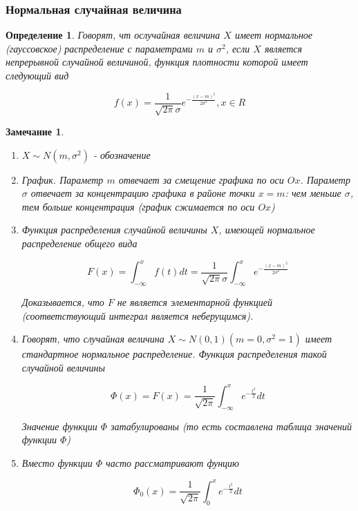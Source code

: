 \documentclass[a4paper, 14pt]{report}
\newtheorem{defenition}{Определение}[section]
\newtheorem{note}{Замечание}[section]
\begin{document}
\subsubsection{Нормальная случайная величина}

\begin{defenition}
    Говорят, чт ослучайная величина $X$ имеет нормальное (гауссовское) распределение с параметрами $m$ и $\sigma^2$, если $X$ является непрерывной случайной величиной, функция плотности которой имеет следующий вид

    $$
    f(x) = \frac{1}{\sqrt{2 \pi} \sigma} e^{- \frac{(x-m)^2}{2 \sigma^2}}, x \in R
    $$
\end{defenition}

\begin{note}
    \begin{enumerate}
        \item $X \sim N(m, \sigma^2)$ - обозначение
        \item График. Параметр $m$ отвечает за смещение графика по оси $Ox$. Параметр $\sigma$ отвечает за концентрацию графика в районе точки $x=m$: чем меньше $\sigma$, тем больше концентрация (график сжимается по оси $Ox$)
        \item Функция распределения случайной величины $X$, имеющей нормальное распределение общего вида

            $$
            F(x) = \int_{-\infty}^x f(t)dt = \frac{1}{\sqrt{2 \pi} \sigma} \int_{-\infty}^x e^{- \frac{(x-m)^2}{2 \sigma^2}}
            $$

            Доказывается, что $F$ не является элементарной функцией (соответствующий интеграл является неберущимся).

        \item Говорят, что случайная величина $X \sim N(0,1) (m=0, \sigma^2= 1)$ имеет стандартное нормальное распределение. Функция распределения такой случайной величины

            $$
            \Phi(x) = F(x) = \frac{1}{\sqrt{2 \pi}} \int_{-\infty}^{x} e^{-\frac{t^2}{2}} dt
            $$

            Значение функции $\Phi$ затабулированы (то есть составлена таблица значений функции $\Phi$)

        \item Вместо функции $\Phi$ часто рассматривают фунцию

            $$
            \Phi_0(x) = \frac{1}{\sqrt{2 \pi}} \int_0^x e^{-\frac{t^2}{2}} dt
            $$


\end{enumerate}
\end{note}
\end{document}
